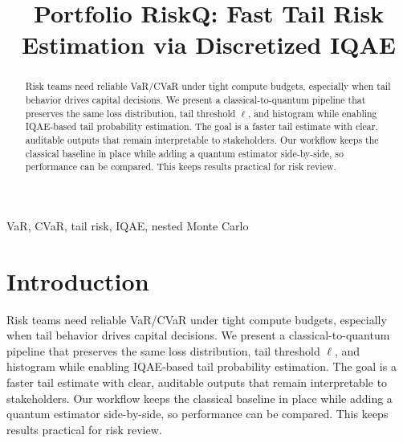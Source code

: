 \documentclass[conference]{IEEEtran}
\begin{document}
\title{Portfolio RiskQ: Fast Tail Risk Estimation via Discretized IQAE}

\author{
\and
{}
}

\maketitle

\begin{abstract}
Risk teams need reliable VaR/CVaR under tight compute budgets, especially when tail behavior drives capital decisions. We present a classical-to-quantum pipeline that preserves the same loss distribution, tail threshold $\ell$, and histogram while enabling IQAE-based tail probability estimation. The goal is a faster tail estimate with clear, auditable outputs that remain interpretable to stakeholders. Our workflow keeps the classical baseline in place while adding a quantum estimator side-by-side, so performance can be compared. This keeps results practical for risk review.
\end{abstract}

\begin{IEEEkeywords}
VaR, CVaR, tail risk, IQAE, nested Monte Carlo
\end{IEEEkeywords}

\section{Introduction}
Risk teams need reliable VaR/CVaR under tight compute budgets, especially when tail behavior drives capital decisions. We present a classical-to-quantum pipeline that preserves the same loss distribution, tail threshold $\ell$, and histogram while enabling IQAE-based tail probability estimation. The goal is a faster tail estimate with clear, auditable outputs that remain interpretable to stakeholders. Our workflow keeps the classical baseline in place while adding a quantum estimator side-by-side, so performance can be compared. This keeps results practical for risk review.
\end{document}
